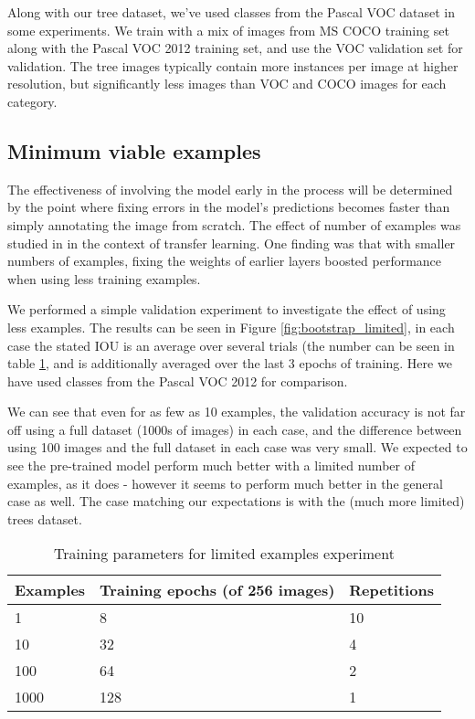 Along with our tree dataset, we've used classes from the Pascal VOC dataset in some experiments. We train with a mix of images from MS COCO \cite{Lin2014} training set along with the Pascal VOC 2012 training set, and use the VOC validation set for validation. The tree images typically contain more instances per image at higher resolution, but significantly less images than VOC and COCO images for each category.


\subsection {Minimum viable examples}

The effectiveness of involving the model early in the process will be determined by the point where fixing errors in the model's predictions becomes faster than simply annotating the image from scratch. The effect of number of examples was studied in \cite{Soekhoe} in the context of transfer learning. One finding was that with smaller numbers of examples, fixing the weights of earlier layers boosted performance when using less training examples.

We performed a simple validation experiment to investigate the effect of using less examples. The results can be seen in Figure \ref{fig:bootstrap_limited}, in each case the stated IOU is an average over several trials (the number can be seen in table \ref{fig:bootstrap_limit_params}, and is additionally averaged over the last 3 epochs of training. Here we have used classes from the Pascal VOC 2012 for comparison.

We can see that even for as few as 10 examples, the validation accuracy is not far off using a full dataset (1000s of images) in each case, and the difference between using 100 images and the full dataset in each case was very small. We expected to see the pre-trained model perform much better with a limited number of examples, as it does - however it seems to perform much better in the general case as well. The case matching our expectations is with the (much more limited) trees dataset.


\begin{table}[ht]
  \centering
    \caption{Training parameters for limited examples experiment}

  \begin{tabular}{ l  l  l}
    Examples & Training epochs (of 256 images) & Repetitions \\
    \toprule
    1 	  & 8 	& 10 \\
    10 	  & 32 	& 4  \\
    100   & 64 	& 2 \\
    1000  & 128 & 1 \\
    \bottomrule
  \end{tabular}
\label{fig:bootstrap_limit_params}
\end{table}



